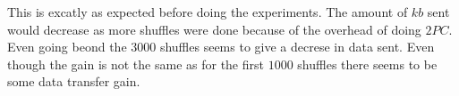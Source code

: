 \documentclass[twoside,11pt,openright]{report}
\begin{document}
This is excatly as expected before doing the experiments. The amount of $kb$ sent would decrease as more shuffles were done because of the overhead of doing $2PC$. Even going beond the $3000$ shuffles seems to give a decrese in data sent. Even though the gain is not the same as for the first $1000$ shuffles there seems to be some data transfer gain.

\bigskip

\begin{figure}
    \centering

    \begin{subfigure}{\textwidth}
        \centering
        \caption{}
        \label{fig:const_ms_plot}
    \end{subfigure}

    \vspace*{0cm}

    \begin{subfigure}{\textwidth}
        \centering
        \caption{}
        \label{fig:eval_ms_plot}
    \end{subfigure}


\end{figure}
\end{document}
